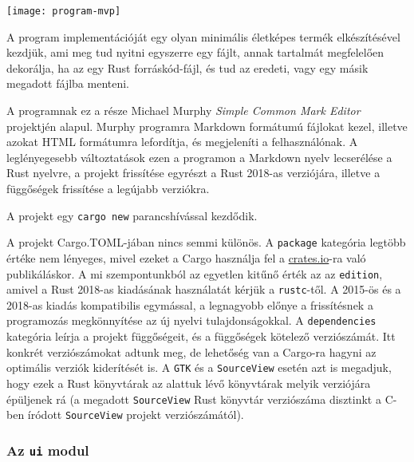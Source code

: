
\graphicspath{{./kepek/}}


\texttt{[image: program-mvp]}

A program implementációját egy olyan minimális életképes termék elkészítésével kezdjük,
ami meg tud nyitni egyszerre egy fájlt, annak tartalmát megfelelően dekorálja,
ha az egy Rust forráskód-fájl, és tud az eredeti, vagy egy másik megadott fájlba menteni.

A programnak ez a része Michael Murphy \textit{Simple Common Mark Editor} projektjén alapul.\cite{gtk_tutorial}
Murphy programra Markdown formátumú fájlokat kezel, illetve azokat HTML formátumra lefordítja,
és megjeleníti a felhasználónak.
A leglényegesebb változtatások ezen a programon a Markdown nyelv lecserélése a Rust nyelvre,
a projekt frissítése egyrészt a Rust 2018-as verziójára, illetve a függőségek frissítése a legújabb verziókra.

A projekt egy \texttt{cargo new} parancshívással kezdődik.




A projekt Cargo.TOML-jában nincs semmi különös.
A \texttt{package} kategória legtöbb értéke nem lényeges, mivel ezeket a Cargo használja fel
a \url{crates.io}-ra való publikáláskor.
A mi szempontunkból az egyetlen kitűnő érték az az \texttt{edition}, amivel a Rust 2018-as
kiadásának használatát kérjük a \texttt{rustc}-től.
A 2015-ös és a 2018-as kiadás kompatibilis egymással,\cite{rust:editions}
a legnagyobb előnye a frissítésnek a programozás megkönnyítése az új nyelvi tulajdonságokkal.
A \texttt{dependencies} kategória leírja a projekt függőségeit, és a függőségek kötelező verziószámát.
Itt konkrét verziószámokat adtunk meg, de lehetőség van a Cargo-ra hagyni az optimális verziók kiderítését is.
A \texttt{GTK} és a \texttt{SourceView} esetén azt is megadjuk, 
hogy ezek a Rust könyvtárak az alattuk lévő könyvtárak melyik verziójára épüljenek rá
(a megadott \texttt{SourceView} Rust könyvtár verziószáma disztinkt a C-ben íródott \texttt{SourceView}
projekt verziószámától).


\subsubsection{Az \texttt{ui} modul}

